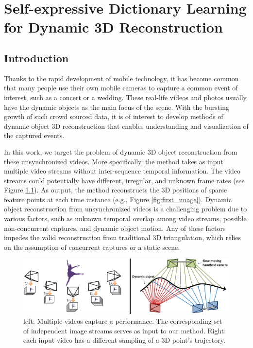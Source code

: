 \chapter{Self-expressive Dictionary Learning for Dynamic 3D Reconstruction} \label{ch:video_l1}

\section{Introduction}

Thanks to the rapid development of mobile technology, it has become common that many people use their own mobile cameras to capture a common event of interest, such as a concert or a wedding. These real-life videos and photos usually have the dynamic objects as the main focus of the scene. With the bursting growth of such crowd sourced data, it is of interest to develop methods of dynamic object 3D reconstruction that enables understanding and visualization of the captured events.

In this work, we target the problem of dynamic 3D object reconstruction from these unsynchronized videos. 
More specifically, the method takes as input multiple video streams without inter-sequence temporal information. The video streams could potentially have different, irregular, and unknown frame rates (see Figure \ref{fig:overview}). 
As output, the method reconstructs the 3D positions of sparse feature points at each time instance (e.g., Figure \ref{fig:first_image}). 
Dynamic object reconstruction from unsynchronized videos is a challenging problem due to various factors, such as unknown temporal overlap among video streams, possible non-concurrent captures, and dynamic object motion. Any of these factors impedes the valid reconstruction from traditional 3D triangulation, which relies on the assumption of concurrent captures or a static scene.


\begin{figure}
\centering
\includegraphics[width=1\textwidth]{chapter5/resource/overview_1_cropped.pdf}
\caption{\label{fig:overview} left: Multiple videos capture a performance.
The corresponding set of independent image streams  serves as input to our method.
Right: each input video has a different sampling of a 3D point's trajectory.}
\end{figure}


